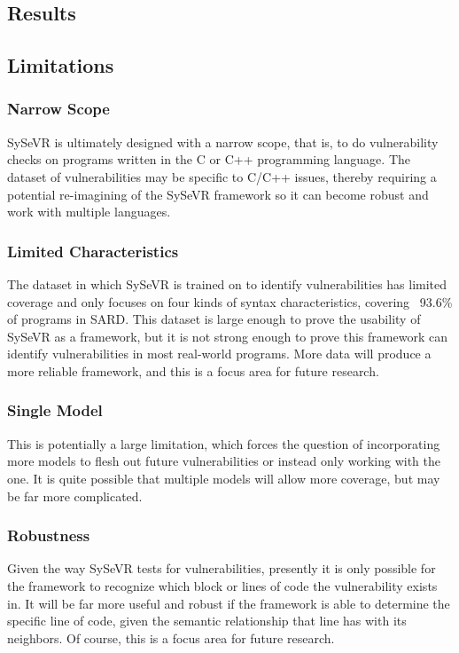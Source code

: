 \documentclass[12pt,twocolumn,letterpaper]{article}
\begin{document}
\subsection{Results}
\label{sub:results}

\subsection{Limitations}
\label{sub:limitations}
\subsubsection{Narrow Scope}
SySeVR is ultimately designed with a narrow scope, that is, to do vulnerability checks on programs written in
the C or C++ programming language. The dataset of vulnerabilities may be specific to C/C++ issues, thereby requiring
a potential re-imagining of the SySeVR framework so it can become robust and work with multiple languages.
\subsubsection{Limited Characteristics}
The dataset in which SySeVR is trained on to identify vulnerabilities has limited coverage and only focuses on four
kinds of syntax characteristics, covering ~93.6\% of programs in SARD. This dataset is large enough to prove the usability
of SySeVR as a framework, but it is not strong enough to prove this framework can identify vulnerabilities in most real-world
programs. More data will produce a more reliable framework, and this is a focus area for future research.
\subsubsection{Single Model}
This is potentially a large limitation, which forces the question of incorporating more models to flesh out future
vulnerabilities or instead only working with the one. It is quite possible that multiple models will allow more coverage, but
may be far more complicated.
\subsubsection{Robustness}
Given the way SySeVR tests for vulnerabilities, presently it is only possible for the framework to recognize which
block or lines of code the vulnerability exists in. It will be far more useful and robust if the framework is able to
determine the specific line of code, given the semantic relationship that line has with its neighbors. Of course, this is
a focus area for future research.
\end{document}
